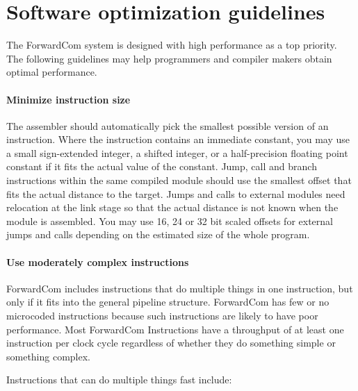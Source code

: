 \documentclass[forwardcom.tex]{subfiles}
\begin{document}
\RaggedRight

\chapter{Software optimization guidelines} \label{SoftwareOptimization}

The ForwardCom system is designed with high performance as a top priority. The following guidelines may help programmers and compiler makers obtain optimal performance.

\subsubsection{Minimize instruction size}
The assembler should automatically pick the smallest possible version of an instruction. Where the instruction contains an immediate constant, you may use a small sign-extended integer, a shifted integer, or a half-precision floating point constant if it fits the actual value of the constant. Jump, call and branch instructions within the same compiled module should use the smallest offset that fits the actual distance to the target. Jumps and calls to external modules need relocation at the link stage so that the actual distance is not known when the module is assembled. You may use 16, 24 or 32 bit scaled offsets for external jumps and calls depending on the estimated size of the whole program.

\subsubsection{Use moderately complex instructions}
ForwardCom includes instructions that do multiple things in one instruction, but only if it fits into the general pipeline structure. ForwardCom has few or no microcoded instructions because such instructions are likely to have poor performance. Most ForwardCom Instructions have a throughput of at least one instruction per clock cycle regardless of whether they do something simple or something complex.
\vspace{2mm}

Instructions that can do multiple things fast include:
\end{document}
